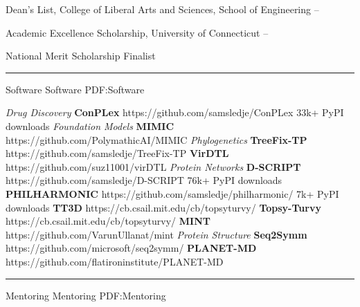 \documentclass[letterpaper,MMMyyyy,nonstopmode]{simpleresumecv}
\begin{document}
\begin{Body}
\Entry
{Dean's List, College of Liberal Arts and Sciences, School of Engineering}
\hfill
{} --
\Gap

\Entry
{Academic Excellence Scholarship, University of Connecticut}
\hfill
{} -- 
\Gap




\Entry
{National Merit Scholarship Finalist}
\hfill
{}

\BigGap
\hrule
\Section
{Software}
{Software}
{PDF:Software}

\Gap
\textit{Drug Discovery}
\Gap
\Entry
{\textbf{ConPLex}}
\hfill https://github.com/samsledje/ConPLex
\Gap
\Item
33k+ PyPI downloads
\BigGap
\Gap
\textit{Foundation Models}
\Gap
\Entry
{\textbf{MIMIC}}
\hfill https://github.com/PolymathicAI/MIMIC
\BigGap
\Gap
\textit{Phylogenetics}
\Gap
\Entry
{\textbf{TreeFix-TP}}
\hfill https://github.com/samsledje/TreeFix-TP
\BigGap
\Entry
{\textbf{VirDTL}}
\hfill https://github.com/suz11001/virDTL
\BigGap
\Gap
\textit{Protein Networks}
\Gap
\Entry
{\textbf{D-SCRIPT}}
\hfill https://github.com/samsledje/D-SCRIPT
\Gap
\Item
76k+ PyPI downloads
\BigGap
\Entry
{\textbf{PHILHARMONIC}}
\hfill https://github.com/samsledje/philharmonic/
\Gap
\Item
7k+ PyPI downloads
\BigGap
\Entry
{\textbf{TT3D}}
\hfill https://cb.csail.mit.edu/cb/topsyturvy/
\BigGap
\Entry
{\textbf{Topsy-Turvy}}
\hfill https://cb.csail.mit.edu/cb/topsyturvy/
\BigGap
\Entry
{\textbf{MINT}}
\hfill https://github.com/VarunUllanat/mint
\BigGap
\Gap
\textit{Protein Structure}
\Gap
\Entry
{\textbf{Seq2Symm}}
\hfill https://github.com/microsoft/seq2symm/
\BigGap
\Entry
{\textbf{PLANET-MD}}
\hfill https://github.com/flatironinstitute/PLANET-MD
\BigGap


\BigGap
\hrule
\Section
{Mentoring}
{Mentoring}
{PDF:Mentoring}


\end{Body}
\end{document}
